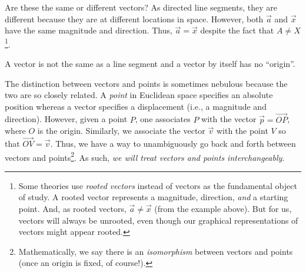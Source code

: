 \begin{center}
\end{center}

Are these 
the same or different vectors?  As directed line segments,
they are different because they are at different locations in space.  
However, both $\vec a$ and $\vec x$ have the same
magnitude and direction.  Thus, $\vec a=\vec x$ despite the fact that $A\neq X$\footnote{
	Some theories use \emph{rooted vectors} instead of
	vectors as the fundamental object of study. A rooted vector
	represents a magnitude, direction, \emph{and} a starting point. And, 
	as rooted vectors, $\vec a\neq \vec x$ (from the example above).
	But for us, vectors will always be unrooted, even though our graphical
	representations of vectors might appear rooted.
}.
\begin{emphbox}[Takeaway]
	A vector is not the same as a line segment and a vector by itself
	has no ``origin''.
\end{emphbox}


The distinction between vectors and points is sometimes nebulous because
the two are so closely related.  A \emph{point}
in Euclidean space specifies an absolute position whereas a vector
specifies a displacement (i.e., a magnitude and direction).  However, given a point $P$,
one associates $P$ with the vector $\vec p=\overrightarrow{OP}$, where $O$
is the origin.  Similarly, we associate the vector $\vec v$ with
the point $V$ so that $\overrightarrow{OV}=\vec v$.
Thus, we have a way to unambiguously go back and forth between vectors and
points\footnote{ Mathematically, we say there is an \emph{isomorphism} between
vectors and points (once an origin is fixed, of course!).}.  As such, \emph{we will treat vectors and points
interchangeably}.

